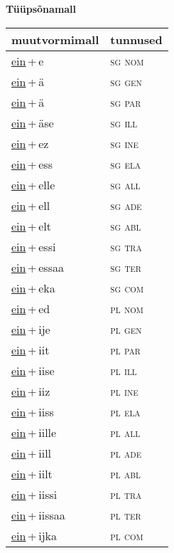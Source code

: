 
\vspace{1.8em}
\begin{minipage}{\textwidth}
\textbf{Tüüpsõnamall \,}\\

\begin{sideways}
\begin{tabular}{l l}
muutvormimall & tunnused \\
\hline
\underline{ein}\,+\,e & \textsc{ sg nom } \\
\underline{ein}\,+\,ä & \textsc{ sg gen } \\
\underline{ein}\,+\,ä & \textsc{ sg par } \\
\underline{ein}\,+\,äse & \textsc{ sg ill } \\
\underline{ein}\,+\,ez & \textsc{ sg ine } \\
\underline{ein}\,+\,ess & \textsc{ sg ela } \\
\underline{ein}\,+\,elle & \textsc{ sg all } \\
\underline{ein}\,+\,ell & \textsc{ sg ade } \\
\underline{ein}\,+\,elt & \textsc{ sg abl } \\
\underline{ein}\,+\,essi & \textsc{ sg tra } \\
\underline{ein}\,+\,essaa & \textsc{ sg ter } \\
\underline{ein}\,+\,eka & \textsc{ sg com } \\
\underline{ein}\,+\,ed & \textsc{ pl nom } \\
\underline{ein}\,+\,ije & \textsc{ pl gen } \\
\underline{ein}\,+\,iit & \textsc{ pl par } \\
\underline{ein}\,+\,iise & \textsc{ pl ill } \\
\underline{ein}\,+\,iiz & \textsc{ pl ine } \\
\underline{ein}\,+\,iiss & \textsc{ pl ela } \\
\underline{ein}\,+\,iille & \textsc{ pl all } \\
\underline{ein}\,+\,iill & \textsc{ pl ade } \\
\underline{ein}\,+\,iilt & \textsc{ pl abl } \\
\underline{ein}\,+\,iissi & \textsc{ pl tra } \\
\underline{ein}\,+\,iissaa & \textsc{ pl ter } \\
\underline{ein}\,+\,ijka & \textsc{ pl com } \\
\end{tabular}
\end{sideways}
\label{tab:tüüpsõnamall-eine}

\end{minipage}

